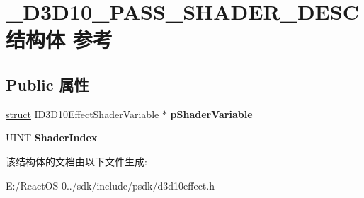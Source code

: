 \hypertarget{struct___d3_d10___p_a_s_s___s_h_a_d_e_r___d_e_s_c}{}\section{\+\_\+\+D3\+D10\+\_\+\+P\+A\+S\+S\+\_\+\+S\+H\+A\+D\+E\+R\+\_\+\+D\+E\+S\+C结构体 参考}
\label{struct___d3_d10___p_a_s_s___s_h_a_d_e_r___d_e_s_c}
\subsection*{Public 属性}
\begin{DoxyCompactItemize}
\item 
\mbox{\label{struct___d3_d10___p_a_s_s___s_h_a_d_e_r___d_e_s_c_a219f622d5e3d3de3d06af6be6a8eaaf0}} 
\hyperlink{interfacestruct}{struct} I\+D3\+D10\+Effect\+Shader\+Variable $\ast$ {\bfseries p\+Shader\+Variable}
\item 
\mbox{\label{struct___d3_d10___p_a_s_s___s_h_a_d_e_r___d_e_s_c_a31b13f0be48fc32a0a2ace801c2c519a}} 
U\+I\+NT {\bfseries Shader\+Index}
\end{DoxyCompactItemize}


该结构体的文档由以下文件生成\+:\begin{DoxyCompactItemize}
\item 
E\+:/\+React\+O\+S-\/0../sdk/include/psdk/d3d10effect.\+h\end{DoxyCompactItemize}
